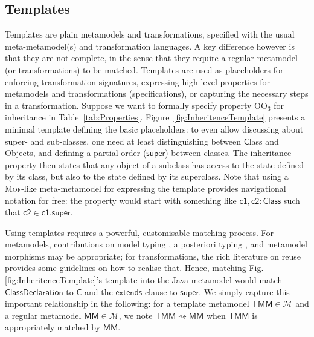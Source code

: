 \subsection{Templates}
\label{sec:Templates}

Templates are plain metamodels and transformations, specified with the usual
meta-metamodel(s) and transformation languages.
A key difference however is that they are not complete, in the sense that they
require a regular metamodel (or transformations) to be matched.
Templates are used as placeholders for enforcing transformation signatures,
expressing high-level properties for metamodels and transformations
(specifications), or capturing the necessary steps in a transformation.
Suppose we want to formally specify property $\mbox{OO}_3$ for inheritance in 
Table~\ref{tab:Properties}. 
Figure~\ref{fig:InheritenceTemplate} presents a 
minimal template defining the basic placeholders: to even allow discussing 
about super- and sub-classes, one need at least distinguishing between 
$\mathsf{C}$lass and Objects, and defining a partial order ($\mathsf{super}$) 
between classes. The inheritance property then states that any object of a 
subclass has access to the state defined by its class, but also to the state 
defined by its superclass. Note that using a \textsc{Mof}-like meta-metamodel 
for expressing the template provides navigational notation for free: the 
property would start with something like $\mathsf{c1, c2 : Class}$ such that 
$\mathsf{c2} \in \mathsf{c1.super}$.

Using templates requires a powerful, customisable matching process.
For metamodels, contributions on model typing \cite{J:Degueule-etAl:2017}, a
posteriori typing \cite{J:deLara-Guerra:2017}, and metamodel morphisms
\cite{Salay-Mylopoulos-Esterbrook:2008,Duran-Zschaler-Troya:2012} may be
appropriate; for transformations, the rich literature on reuse
\cite{J:Kusel-etAl:2015} provides some guidelines on how to realise that.
Hence, matching Fig. \ref{fig:InheritenceTemplate}'s template into the Java
metamodel \cite{B:Java:2019} would match $\mathsf{ClassDeclaration}$ to
$\mathsf{C}$ and the $\mathsf{extends}$ clause to $\mathsf{super}$.
We simply capture this important relationship in the following: for a template
metamodel $\mathsf{TMM}\in\mathcal{M}$ and a regular metamodel
$\mathsf{MM}\in\mathcal{M}$, we note $\mathsf{TMM} \rightsquigarrow \mathsf{MM}$
when $\mathsf{TMM}$ is appropriately matched by $\mathsf{MM}$.

